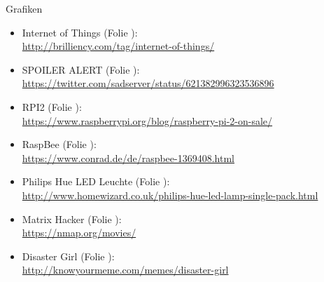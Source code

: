 \documentclass[10pt, compress]{beamer}
\begin{document}
\begin{frame}{Grafiken}
  \begin{itemize}
    \item \small{Internet of Things (Folie \pageref{fig:iot}):}\\
      \footnotesize{
        \url{http://brilliency.com/tag/internet-of-things/}
      }
    \item \small{SPOILER ALERT (Folie \pageref{fig:spoiler}):}\\
      \footnotesize{
        \url{https://twitter.com/sadserver/status/621382996323536896}
      }
    \item \small{RPI2 (Folie \pageref{fig:rpi}):}\\
      \footnotesize{
        \url{https://www.raspberrypi.org/blog/raspberry-pi-2-on-sale/}
      }
    \item \small{RaspBee (Folie \pageref{fig:rbee}):}\\
      \footnotesize{
        \url{https://www.conrad.de/de/raspbee-1369408.html}
      }
    \item \small{Philips Hue LED Leuchte (Folie \pageref{fig:hue}):}\\
      \footnotesize{
        \url{http://www.homewizard.co.uk/philips-hue-led-lamp-single-pack.html}
      }
    \item \small{Matrix Hacker (Folie \pageref{fig:matrix}):}\\
      \footnotesize{
        \url{https://nmap.org/movies/}
      }
    \item \small{Disaster Girl (Folie \pageref{fig:disaster}):}\\
      \footnotesize{
        \url{http://knowyourmeme.com/memes/disaster-girl}
      }
  \end{itemize}
  
\end{frame}
\end{document}
